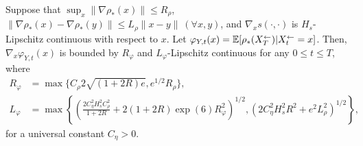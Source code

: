\begin{lem}\label{lemm:phiYboundLip}
Suppose that
$\sup_x\|\nabla \rho_*(x)\|\leq R_\rho$, $\|\nabla \rho_*(x) - \nabla \rho_*(y)\| \leq L_\rho\|x-y\|~(\forall x,y)$, and 
$\nabla_x s(\cdot,\cdot)$ is $H_s$-Lipschitz continuous with respect to $x$. 
Let $\varphi_{Y,t}(x) = \mathbb{E}[\rho_*({X}_{T}^\leftarrow)| {X}_{t}^\leftarrow = x]$. 
Then, $\nabla_x \varphi_{Y,t}(x)$ is bounded by $R_\varphi$ and $L_\varphi$-Lipschitz continuous for any $0 \leq t \leq T$, where  
\begin{align}
R_\varphi &=  \max\{C_\rho 2\sqrt{(1+2R) e},e^{1/2} R_\rho\}, 
\\
L_\varphi &= \max\left\{\left( \frac{2 C_\eta^2 H_s^2 C_\rho^2}{1+2R} + 
2 (1 + 2R) \exp(6)R_\varphi^2 \right)^{1/2},
\left(2 C_\eta^2 H_s^2 R^2 + e^2 L_\rho^2 \right)^{1/2}
\right\}, 
\end{align}
for a universal constant $C_\eta > 0$. 
\end{lem}
